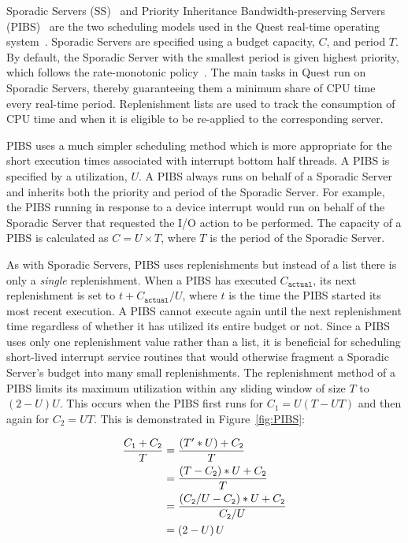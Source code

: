 Sporadic Servers (SS)~\cite{Sprunt90} and Priority Inheritance
Bandwidth-preserving Servers (PIBS)~\cite{DanishLiWe11} are the two scheduling
models used in the Quest real-time operating system~\cite{quest-webpage}.
Sporadic Servers are specified using a budget capacity, $C$, and period
$T$. By default, the Sporadic Server with the smallest period is given highest
priority, which follows the rate-monotonic policy~\cite{LiuLa73}. The main
tasks in Quest run on Sporadic Servers, thereby guaranteeing them a minimum
share of CPU time every real-time period.  Replenishment lists are used to
track the consumption of CPU time and when it is eligible to be re-applied to
the corresponding server.

PIBS uses a much simpler scheduling method which is more appropriate for the
short execution times associated with interrupt bottom half threads.  A PIBS
is specified by a utilization, $U$.  A PIBS always runs on behalf of a
Sporadic Server and inherits both the priority and period of the Sporadic
Server.  For example, the PIBS running in response to a device interrupt would
run on behalf of the Sporadic Server that requested the I/O action to be
performed.  The capacity of a PIBS is calculated as $C{=}U{\times}T$, where
$T$ is the period of the Sporadic Server.

As with Sporadic Servers, PIBS uses replenishments but instead of a list there
is only a {\em single} replenishment.  When a PIBS has executed
$C_\mathtt{actual}$, its next replenishment is set to $t+C_\mathtt{actual}/U$,
where $t$ is the time the PIBS started its most recent execution.  A PIBS cannot
execute again until the next replenishment time regardless of whether it has
utilized its entire budget or not. Since a PIBS uses only one replenishment
value rather than a list, it is beneficial for scheduling short-lived interrupt
service routines that would otherwise fragment a Sporadic Server's budget into
many small replenishments. The replenishment method of a PIBS limits its maximum
utilization within any sliding window of size $T$ to $\left(2-U\right)U$.  This
occurs when the PIBS first runs for $C_{1}{=}U(T-UT)$ and then again for
$C_{2}{=}UT$.  This is demonstrated in Figure~\ref{fig:PIBS}:

\begin{align*}
\frac{C_{\mathtt{1}} + C_{\mathtt{2}}}{T}
&=\frac{\left(T^\prime*U\right)+C_{\mathtt{2}}}{T} \\
&=\frac{\left(T-C_{\mathtt{2}}\right)*U+C_{\mathtt{2}}}{T} \\
&=\frac{\left(C_{\mathtt{2}}/U-C_{\mathtt{2}}\right)*U+C_{\mathtt{2}}}{C_{\mathtt{2}}/U} \\
&=\left(2-U\right)U
\normalsize
\end{align*}

